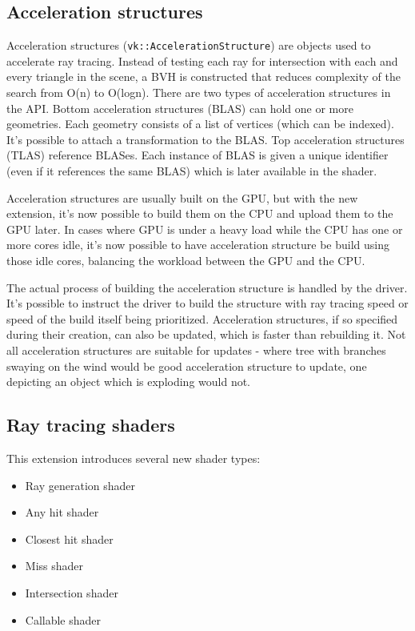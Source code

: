 \documentclass[times, utf8, zavrsni, numeric]{fer}
\begin{document}
\subsection{Acceleration structures}
Acceleration structures (\texttt{vk::AccelerationStructure}) are objects used to accelerate ray tracing. Instead of testing each ray for intersection with each and every triangle in the scene, a BVH is constructed that reduces complexity of the search from O(n) to O(logn). There are two types of acceleration structures in the API. Bottom acceleration structures (BLAS) can hold one or more geometries. Each geometry consists of a list of vertices (which can be indexed). It's possible to attach a transformation to the BLAS. Top acceleration structures (TLAS) reference BLASes. Each instance of BLAS is given a unique identifier (even if it references the same BLAS) which is later available in the shader.

Acceleration structures are usually built on the GPU, but with the new extension, it's now possible to build them on the CPU and upload them to the GPU later. In cases where GPU is under a heavy load while the CPU has one or more cores idle, it's now possible to have acceleration structure be build using those idle cores, balancing the workload between the GPU and the CPU.

The actual process of building the acceleration structure is handled by the driver. It's possible to instruct the driver to build the structure with ray tracing speed or speed of the build itself being prioritized. Acceleration structures, if so specified during their creation, can also be updated, which is faster than rebuilding it. Not all acceleration structures are suitable for updates - where tree with branches swaying on the wind would be good acceleration structure to update, one depicting an object which is exploding would not.

\subsection{Ray tracing shaders}
This extension introduces several new shader types:
\begin{itemize}
	\item{Ray generation shader}
	\item{Any hit shader}
	\item{Closest hit shader}
	\item{Miss shader}
	\item{Intersection shader}
	\item{Callable shader}
\end{itemize}
\end{document}

